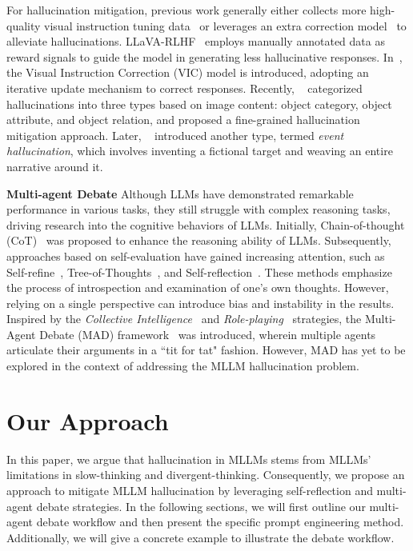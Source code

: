 \documentclass[10pt,twocolumn,letterpaper]{article}
\begin{document}
For hallucination mitigation, previous work generally either collects more high-quality visual instruction tuning data~\cite{sun2023, yu2024hallucidoctor} or leverages an extra correction model~\cite{gunjal2024detecting, wang2024vigc} to alleviate hallucinations. LLaVA-RLHF~\cite{sun2023} employs manually annotated data as reward signals to guide the model in generating less hallucinative responses. In~\cite{wang2024vigc}, the Visual Instruction Correction (VIC) model is introduced, adopting an iterative update mechanism to correct responses. Recently, ~\cite{yu2024hallucidoctor} categorized hallucinations into three types based on image content: object category, object attribute, and object relation, and proposed a fine-grained hallucination mitigation approach. Later, ~\cite{jiang2024haleval} introduced another type, termed \emph{event hallucination}, which involves inventing a fictional target and weaving an entire narrative around it.

\noindent\textbf{Multi-agent Debate}
Although LLMs have demonstrated remarkable performance in various tasks, they still struggle with complex reasoning tasks, driving research into the cognitive behaviors of LLMs. Initially, Chain-of-thought (CoT)~\cite{wei2023chainofthought} was proposed to enhance the reasoning ability of LLMs. Subsequently, approaches based on self-evaluation have gained increasing attention, such as Self-refine~\cite{madaan2023}, Tree-of-Thoughts~\cite{yao2023tree}, and Self-reflection~\cite{shinn2023}. These methods emphasize the process of introspection and examination of one's own thoughts. However, relying on a single perspective can introduce bias and instability in the results.
Inspired by the \emph{Collective Intelligence}~\cite{collectiveintelligence} and \emph{Role-playing}~\cite{li2023camel} strategies, the Multi-Agent Debate (MAD) framework~\cite{liang2024divergentthink} was introduced, wherein multiple agents articulate their arguments in a ``tit for tat" fashion. However, MAD has yet to be explored in the context of addressing the MLLM hallucination problem.


\section{Our Approach}
In this paper, we argue that hallucination in MLLMs stems from MLLMs' limitations in slow-thinking and divergent-thinking. Consequently, we propose an approach to mitigate MLLM hallucination by leveraging self-reflection and multi-agent debate strategies. In the following sections, we will first outline our multi-agent debate workflow and then present the specific prompt engineering method. Additionally, %
we will give a concrete example to illustrate the debate workflow. 
\end{document}
